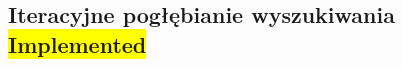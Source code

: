\subsection{Iteracyjne pogłębianie wyszukiwania \colorbox{yellow}{Implemented}}
\label{subsec:iteracyjne-pogebianie-wyszukiwania}
